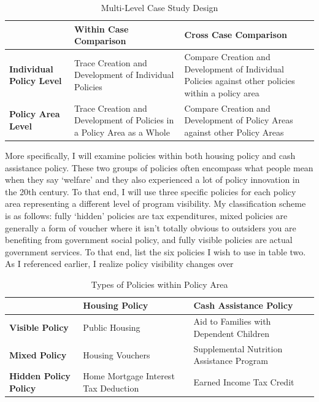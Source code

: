 \documentclass[12pt]{article}
\begin{document}
\begin{table}
\centering
    \begin{tabularx}{\textwidth}{XXX} \toprule
           & \textbf{Within Case Comparison} & \textbf{Cross Case Comparison                                                                              } \\ \midrule
    \textbf{Individual Policy Level} & Trace Creation and Development of Individual Policies        & Compare Creation and Development of Individual Policies against other policies within a policy area \\
    \textbf{Policy Area Level}       & Trace Creation and Development of Policies in a Policy Area as a Whole & Compare Creation and Development of Policy Areas against other Policy Areas                         \\ \bottomrule
    \end{tabularx}
  \caption{Multi-Level Case Study Design}
  \label{tab:casestudy}
\end{table}

More specifically, I will examine policies within both housing policy and cash assistance policy. These two groups of policies often encompass what people mean when they say `welfare' and they also experienced a lot of policy innovation in the 20th century. To that end, I will use three specific policies for each policy area representing a different level of program visibility. My classification scheme is as follows: fully `hidden' policies are tax expenditures, mixed policies are generally a form of voucher where it isn't totally obvious to outsiders you are benefiting from government social policy, and fully visible policies are actual government services. To that end, list the six policies I wish to use in table two. As I referenced earlier, I realize policy visibility changes over


\begin{table}
\centering
    \begin{tabularx}{\textwidth}{XXX} \toprule
           & \textbf{Housing Policy} & \textbf{Cash Assistance Policy} \\ \midrule
    \textbf{Visible Policy} & Public Housing        & Aid to Families with Dependent Children \\
        \textbf{Mixed Policy} & Housing Vouchers        & Supplemental Nutrition Assistance Program \\
    \textbf{Hidden Policy Policy} & Home Mortgage Interest Tax Deduction        & Earned Income Tax Credit \\ \bottomrule
    \end{tabularx}
  \caption{Types of Policies within Policy Area}
  \label{tab:types}
\end{table}
\end{document}
